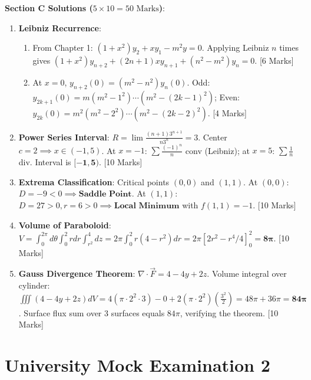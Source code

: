 \begin{solutionbox}
\medskip
\noindent\textbf{Section C Solutions ($5 \times 10 = 50\text{ Marks}$)}:
\begin{enumerate}[start=17]
    \item \textbf{Leibniz Recurrence}:
    \begin{enumerate}[label=(\alph*)]
        \item From Chapter 1: $(1+x^2)y_2 + xy_1 - m^2 y = 0$. Applying Leibniz $n$ times gives $(1+x^2)y_{n+2} + (2n+1)xy_{n+1} + (n^2-m^2)y_n = 0$. [6 Marks]
        \item At $x=0$, $y_{n+2}(0) = (m^2-n^2)y_n(0)$. Odd: $y_{2k+1}(0) = m(m^2-1^2)\cdots(m^2-(2k-1)^2)$; Even: $y_{2k}(0) = m^2(m^2-2^2)\cdots(m^2-(2k-2)^2)$. [4 Marks]
    \end{enumerate}
    \item \textbf{Power Series Interval}: $R = \lim \frac{(n+1)3^{n+1}}{n 3^n} = 3$. Center $c = 2 \implies x \in (-1, 5)$. At $x = -1$: $\sum \frac{(-1)^n}{n}$ conv (Leibniz); at $x = 5$: $\sum \frac{1}{n}$ div. Interval is $\mathbf{[-1, 5)}$. [10 Marks]
    \item \textbf{Extrema Classification}: Critical points $(0,0)$ and $(1,1)$. At $(0,0)$: $D = -9 < 0 \implies \mathbf{\text{Saddle Point}}$. At $(1,1)$: $D = 27 > 0, r = 6 > 0 \implies \mathbf{\text{Local Minimum}}$ with $f(1,1) = -1$. [10 Marks]
    \item \textbf{Volume of Paraboloid}: $V = \int_0^{2\pi} d\theta \int_0^2 r dr \int_{r^2}^4 dz = 2\pi \int_0^2 r(4-r^2)dr = 2\pi [2r^2 - r^4/4]_0^2 = \mathbf{8\pi}$. [10 Marks]
    \item \textbf{Gauss Divergence Theorem}: $\nabla\cdot\vec{F} = 4 - 4y + 2z$. Volume integral over cylinder: $\iiint (4 - 4y + 2z) dV = 4(\pi \cdot 2^2 \cdot 3) - 0 + 2(\pi \cdot 2^2)(\frac{3^2}{2}) = 48\pi + 36\pi = \mathbf{84\pi}$. Surface flux sum over 3 surfaces equals $84\pi$, verifying the theorem. [10 Marks]
\end{enumerate}
\end{solutionbox}

\section{University Mock Examination 2}

